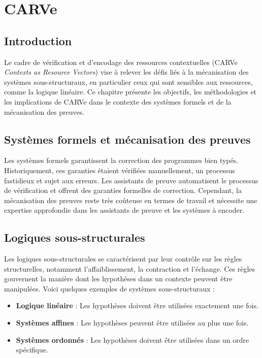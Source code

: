 \chapter{CARVe}
\label{sec::chapitre3}

\section{Introduction}
Le cadre de vérification et d'encodage des ressources contextuelles (CARVe \textit{Contexts as Resource Vectors}) vise à relever les défis liés à la mécanisation des systèmes sous-structuraux, en particulier ceux qui sont sensibles aux ressources, comme la logique linéaire. Ce chapitre présente les objectifs, les méthodologies et les implications de CARVe dans le contexte des systèmes formels et de la mécanisation des preuves.

\section{Systèmes formels et mécanisation des preuves}
Les systèmes formels garantissent la correction des programmes bien typés. Historiquement, ces garanties étaient vérifiées manuellement, un processus fastidieux et sujet aux erreurs. Les assistants de preuve automatisent le processus de vérification et offrent des garanties formelles de correction. Cependant, la mécanisation des preuves reste très coûteuse en termes de travail et nécessite une expertise approfondie dans les assistants de preuve et les systèmes à encoder.

\section{Logiques sous-structurales}
Les logiques sous-structurales se caractérisent par leur contrôle sur les règles structurelles, notamment l'affaiblissement, la contraction et l'échange. Ces règles gouvernent la manière dont les hypothèses dans un contexte peuvent être manipulées. Voici quelques exemples de systèmes sous-structuraux :

\begin{itemize}
    \item \textbf{Logique linéaire} : Les hypothèses doivent être utilisées exactement une fois.
    \item \textbf{Systèmes affines} : Les hypothèses peuvent être utilisées au plus une fois.
    \item \textbf{Systèmes ordonnés} : Les hypothèses doivent être utilisées dans un ordre spécifique.
\end{itemize}


